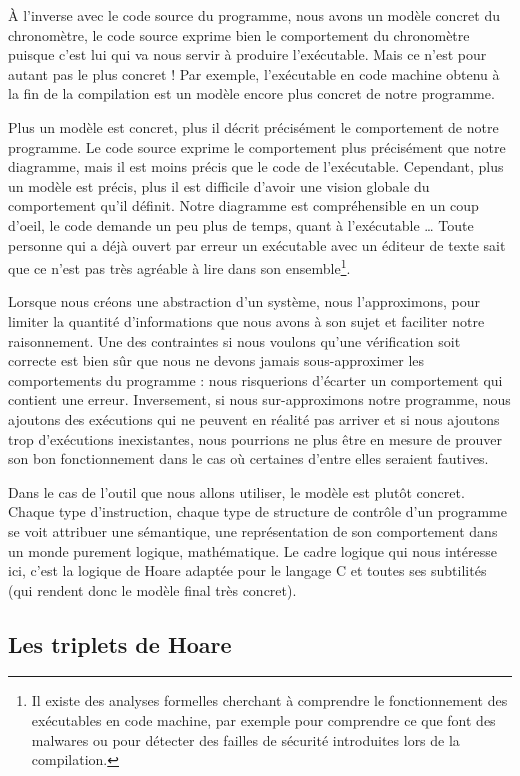 \documentclass[12pt,francais,]{scrbook}
\begin{document}
À l'inverse avec le code source du programme, nous avons un modèle
concret du chronomètre, le code source exprime bien le comportement du
chronomètre puisque c'est lui qui va nous servir à produire
l'exécutable. Mais ce n'est pour autant pas le plus concret ! Par
exemple, l'exécutable en code machine obtenu à la fin de la compilation
est un modèle encore plus concret de notre programme.

Plus un modèle est concret, plus il décrit précisément le comportement
de notre programme. Le code source exprime le comportement plus
précisément que notre diagramme, mais il est moins précis que le code de
l'exécutable. Cependant, plus un modèle est précis, plus il est
difficile d'avoir une vision globale du comportement qu'il définit.
Notre diagramme est compréhensible en un coup d'oeil, le code demande un
peu plus de temps, quant à l'exécutable \ldots{} Toute personne qui a
déjà ouvert par erreur un exécutable avec un éditeur de texte sait que
ce n'est pas très agréable à lire dans son ensemble\footnote{Il existe
  des analyses formelles cherchant à comprendre le fonctionnement des
  exécutables en code machine, par exemple pour comprendre ce que font
  des malwares ou pour détecter des failles de sécurité introduites lors
  de la compilation.}.

Lorsque nous créons une abstraction d'un système, nous l'approximons,
pour limiter la quantité d'informations que nous avons à son sujet et
faciliter notre raisonnement. Une des contraintes si nous voulons qu'une
vérification soit correcte est bien sûr que nous ne devons jamais
sous-approximer les comportements du programme : nous risquerions
d'écarter un comportement qui contient une erreur. Inversement, si nous
sur-approximons notre programme, nous ajoutons des exécutions qui ne
peuvent en réalité pas arriver et si nous ajoutons trop d'exécutions
inexistantes, nous pourrions ne plus être en mesure de prouver son bon
fonctionnement dans le cas où certaines d'entre elles seraient fautives.

Dans le cas de l'outil que nous allons utiliser, le modèle est plutôt
concret. Chaque type d'instruction, chaque type de structure de contrôle
d'un programme se voit attribuer une sémantique, une représentation de
son comportement dans un monde purement logique, mathématique. Le cadre
logique qui nous intéresse ici, c'est la logique de Hoare adaptée pour
le langage C et toutes ses subtilités (qui rendent donc le modèle final
très concret).

\subsection{Les triplets de Hoare}\label{les-triplets-de-hoare}
\end{document}
